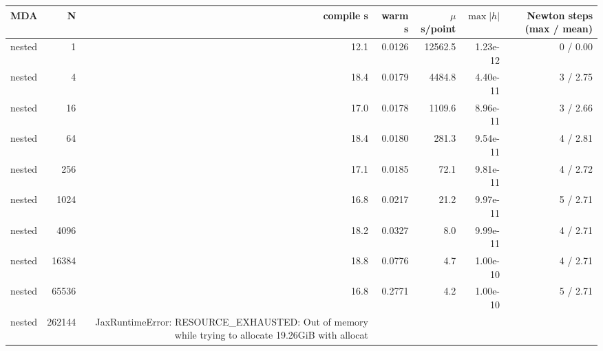 \begin{tabular}{lrrrrrr}
\toprule
MDA & N & compile s & warm s & $\mu$s/point & $\max|h|$ & Newton steps (max / mean) \\
\midrule
nested & 1 & 12.1 & 0.0126 & 12562.5 & 1.23e-12 & 0 / 0.00 \\
nested & 4 & 18.4 & 0.0179 & 4484.8 & 4.40e-11 & 3 / 2.75 \\
nested & 16 & 17.0 & 0.0178 & 1109.6 & 8.96e-11 & 3 / 2.66 \\
nested & 64 & 18.4 & 0.0180 & 281.3 & 9.54e-11 & 4 / 2.81 \\
nested & 256 & 17.1 & 0.0185 & 72.1 & 9.81e-11 & 4 / 2.72 \\
nested & 1024 & 16.8 & 0.0217 & 21.2 & 9.97e-11 & 5 / 2.71 \\
nested & 4096 & 18.2 & 0.0327 & 8.0 & 9.99e-11 & 4 / 2.71 \\
nested & 16384 & 18.8 & 0.0776 & 4.7 & 1.00e-10 & 4 / 2.71 \\
nested & 65536 & 16.8 & 0.2771 & 4.2 & 1.00e-10 & 5 / 2.71 \\
nested & 262144 & JaxRuntimeError: RESOURCE_EXHAUSTED: Out of memory while trying to allocate 19.26GiB with allocat &  &  &  &  \\
\bottomrule
\end{tabular}

